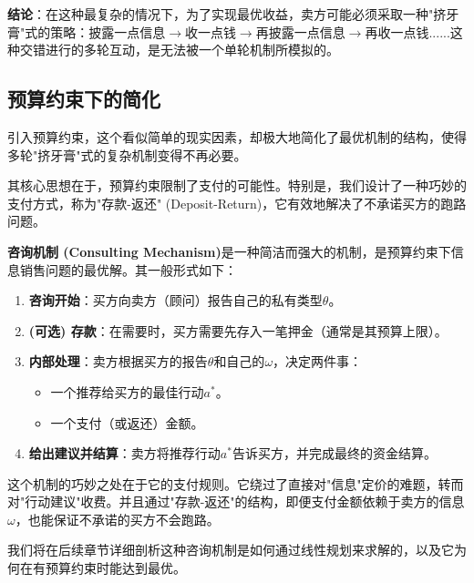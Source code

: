 \textbf{结论}：在这种最复杂的情况下，为了实现最优收益，卖方可能必须采取一种"挤牙膏"式的策略：披露一点信息$\to$收一点钱$\to$再披露一点信息$\to$再收一点钱......这种交错进行的多轮互动，是无法被一个单轮机制所模拟的。

\subsection{预算约束下的简化}

引入预算约束，这个看似简单的现实因素，却极大地简化了最优机制的结构，使得多轮"挤牙膏"式的复杂机制变得不再必要。

其核心思想在于，预算约束限制了支付的可能性。特别是，我们设计了一种巧妙的支付方式，称为"存款-返还" (Deposit-Return)，它有效地解决了不承诺买方的跑路问题。

\textbf{咨询机制 (Consulting Mechanism)}是一种简洁而强大的机制，是预算约束下信息销售问题的最优解。其一般形式如下：
\begin{enumerate}
    \item \textbf{咨询开始}：买方向卖方（顾问）报告自己的私有类型$\theta$。
    \item \textbf{(可选) 存款}：在需要时，买方需要先存入一笔押金（通常是其预算上限）。
    \item \textbf{内部处理}：卖方根据买方的报告$\theta$和自己的$\omega$，决定两件事：
       \begin{itemize}
         \item 一个推荐给买方的最佳行动$a^*$。
         \item 一个支付（或返还）金额。
       \end{itemize}
    \item \textbf{给出建议并结算}：卖方将推荐行动$a^*$告诉买方，并完成最终的资金结算。
\end{enumerate}

这个机制的巧妙之处在于它的支付规则。它绕过了直接对"信息"定价的难题，转而对"行动建议"收费。并且通过"存款-返还"的结构，即便支付金额依赖于卖方的信息$\omega$，也能保证不承诺的买方不会跑路。

我们将在后续章节详细剖析这种咨询机制是如何通过线性规划来求解的，以及它为何在有预算约束时能达到最优。